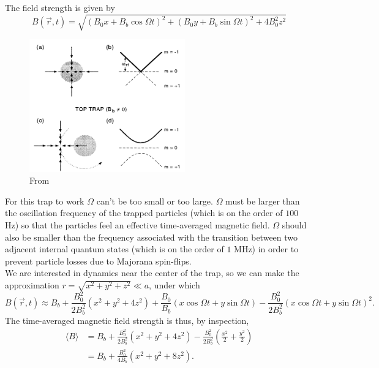 \documentclass{article}
\theoremstyle{definition}
\newcommand{\f}[2]{\frac{#1}{#2}}
\newcommand{\lp}{\left(}
\newcommand{\rp}{\right)}
\begin{document}
The field strength is given by 
\begin{equation*}
B(\vec{r},t) = \sqrt{(B_0 x + B_b\cos\Omega t)^2 + (B_0 y + B_b\sin\Omega t)^2 + 4 B_0^2 z^2 }
\end{equation*}

\begin{figure}[!htb]
	\centering
	\includegraphics[width=0.6\textwidth]{TOP_trap.png}
	\caption{From \cite{PhysRevLett.74.3352}}
\end{figure}

For this trap to work $\Omega$ can't be too small or too large. $\Omega$ must be larger than the oscillation frequency of the trapped particles (which is on the order of $100$ Hz) so that the particles feel an effective time-averaged magnetic field. $\Omega$ should also be smaller than the frequency associated with the transition between two adjacent internal quantum states (which is on the order of $1$ MHz) in order to prevent particle losses due to Majorana spin-flips. \\


We are interested in dynamics near the center of the trap, so we can make the approximation $r = \sqrt{x^2 + y^2 + z^2} \ll a$, under which 
\begin{equation*}
B(\vec{r},t)\approx B_b + \f{B_0^2}{2B_b^2} (x^2 + y^2 + 4z^2) + \f{B_0}{B_b}(x\cos\Omega t+ y\sin\Omega t) - \f{B_0^2}{2B_b^2}(x\cos\Omega t + y\sin\Omega t)^2.
\end{equation*}
The time-averaged magnetic field strength is thus, by inspection,
\begin{align*}
\langle B \rangle 
&= B_b  + \f{B_0^2}{2B_b^2} (x^2 + y^2 + 4z^2) - \f{B_0^2}{2B_b^2}\lp \f{x^2}{2} + \f{y^2}{2}\rp\\ &= B_b + \f{B_0^2}{4B_b}(x^2 + y^2 + 8z^2).
\end{align*}
\end{document}
